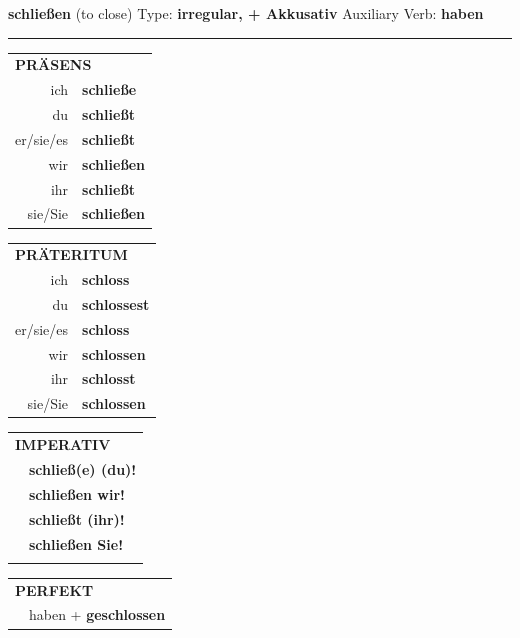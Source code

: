 \documentclass[10pt,a4paper]{revtex4-2}
\begin{document}
\begin{verbbox-acc}
    {\Large \bf schließen} (to close) \hfill Type: \textbf{irregular, + Akkusativ} \hfill Auxiliary Verb: \textbf{haben} 
    
     \vspace{5pt}

    \hrule
    
    \vspace{5pt}

  \begin{tabular}{rl}
     \multicolumn{2}{l}{\textbf{PRÄSENS} }\\
    ich & \textbf{schließe}\\
    du & \textbf{schließt}\\
    er/sie/es & \textbf{schließt}\\
    wir & \textbf{schließen}\\
    ihr & \textbf{schließt}\\
    sie/Sie & \textbf{schließen}\\
  \end{tabular}
  \hfill
     \begin{tabular}{rl}
    \multicolumn{2}{l}{\textbf{PRÄTERITUM} }\\
    ich & \textbf{schloss}\\
    du & \textbf{schlossest}\\
    er/sie/es & \textbf{schloss}\\
    wir & \textbf{schlossen}\\
    ihr & \textbf{schlosst}\\
    sie/Sie & \textbf{schlossen}\\
  \end{tabular}
  \hfill
  \begin{tabular}{rl}
     \multicolumn{2}{l}{\textbf{IMPERATIV} }\\
   & \textbf{schließ(e) (du)!}\\
   & \textbf{schließen wir!}\\
   & \textbf{schließt (ihr)!}\\
   & \textbf{schließen Sie!}\\
   & \vspace{10pt}
  \end{tabular}

    \vspace{10pt}

 \begin{tabular}{rl}
     \multicolumn{2}{l}{\textbf{PERFEKT}}\\
   & haben + \textbf{geschlossen}\\
  \end{tabular}
\hfill
   \begin{tabular}{rl}
   

\end{tabular}
\end{verbbox-acc}
\end{document}
